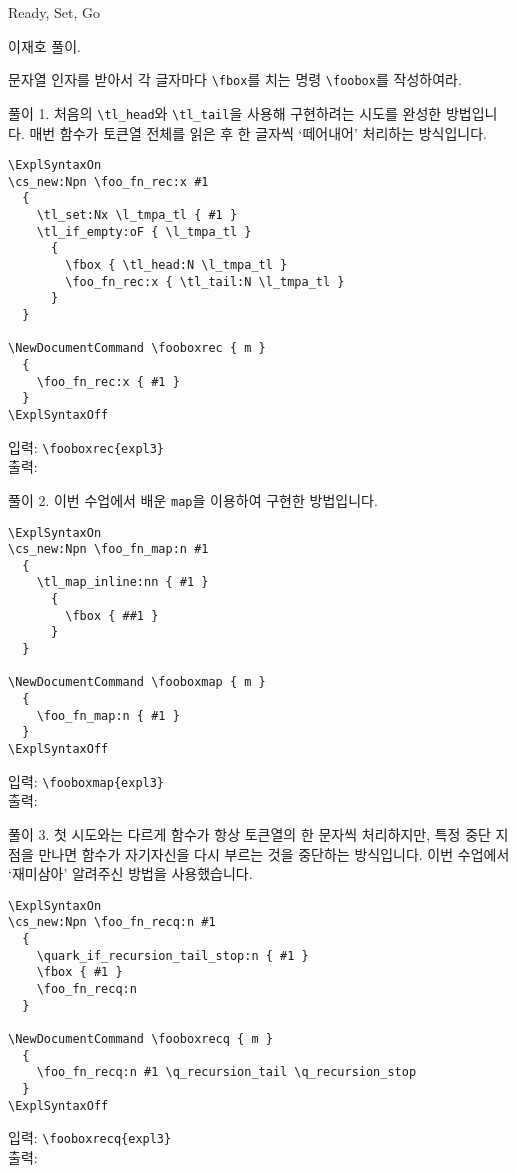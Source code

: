 \documentclass[a4paper,amsmath,itemph]{oblivoir}
\begin{document}
\begin{intro}[2]
  Ready, Set, Go
\end{intro}

이재호 풀이.

\medskip

\begin{questiona}{1}
  문자열 인자를 받아서 각 글자마다 \verb|\fbox|를 치는 명령 \verb|\foobox|를
  작성하여라.

  \tcblower
  풀이 1. 처음의 \verb|\tl_head|와 \verb|\tl_tail|을 사용해 구현하려는 시도를
  완성한 방법입니다.
  매번 함수가 토큰열 전체를 읽은 후 한 글자씩 `떼어내어' 처리하는 방식입니다.

  \begin{verbatim}
\ExplSyntaxOn
\cs_new:Npn \foo_fn_rec:x #1
  {
    \tl_set:Nx \l_tmpa_tl { #1 }
    \tl_if_empty:oF { \l_tmpa_tl }
      {
        \fbox { \tl_head:N \l_tmpa_tl }
        \foo_fn_rec:x { \tl_tail:N \l_tmpa_tl }
      }
  }

\NewDocumentCommand \fooboxrec { m }
  {
    \foo_fn_rec:x { #1 }
  }
\ExplSyntaxOff
  \end{verbatim}

  \begin{tcolorbox}{}
    입력: \verb|\fooboxrec{expl3}|\\
    출력: 
  \end{tcolorbox}

  풀이 2. 이번 수업에서 배운 \verb|map|을 이용하여 구현한 방법입니다.

  \begin{verbatim}
\ExplSyntaxOn
\cs_new:Npn \foo_fn_map:n #1
  {
    \tl_map_inline:nn { #1 }
      {
        \fbox { ##1 }
      }
  }

\NewDocumentCommand \fooboxmap { m }
  {
    \foo_fn_map:n { #1 }
  }
\ExplSyntaxOff
  \end{verbatim}

  \begin{tcolorbox}{}
    입력: \verb|\fooboxmap{expl3}|\\
    출력: 
  \end{tcolorbox}
  
  풀이 3. 첫 시도와는 다르게 함수가 항상 토큰열의 한 문자씩 처리하지만, 특정
  중단 지점을 만나면 함수가 자기자신을 다시 부르는 것을 중단하는 방식입니다.
  이번 수업에서 `재미삼아' 알려주신 방법을 사용했습니다.

  \begin{verbatim}
\ExplSyntaxOn
\cs_new:Npn \foo_fn_recq:n #1
  {
    \quark_if_recursion_tail_stop:n { #1 }
    \fbox { #1 }
    \foo_fn_recq:n
  }

\NewDocumentCommand \fooboxrecq { m }
  {
    \foo_fn_recq:n #1 \q_recursion_tail \q_recursion_stop
  }
\ExplSyntaxOff
  \end{verbatim}

  \begin{tcolorbox}{}
    입력: \verb|\fooboxrecq{expl3}|\\
    출력: 
  \end{tcolorbox}
\end{questiona}
\end{document}
